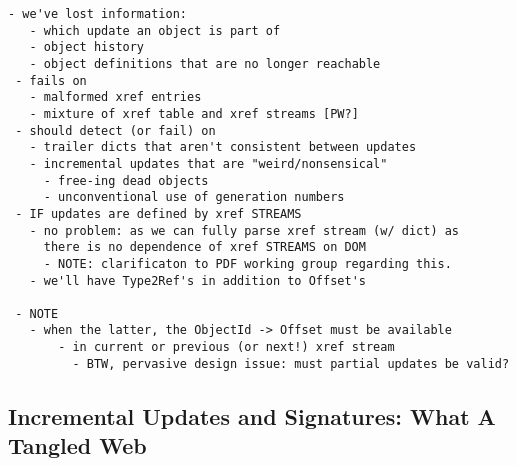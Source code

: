 \begin{lstlisting}[style=meta]
 - we've lost information:
   - which update an object is part of
   - object history
   - object definitions that are no longer reachable
 - fails on
   - malformed xref entries
   - mixture of xref table and xref streams [PW?]
 - should detect (or fail) on
   - trailer dicts that aren't consistent between updates
   - incremental updates that are "weird/nonsensical"
     - free-ing dead objects
     - unconventional use of generation numbers
 - IF updates are defined by xref STREAMS
   - no problem: as we can fully parse xref stream (w/ dict) as
     there is no dependence of xref STREAMS on DOM
     - NOTE: clarificaton to PDF working group regarding this.
   - we'll have Type2Ref's in addition to Offset's
      
 - NOTE 
   - when the latter, the ObjectId -> Offset must be available
       - in current or previous (or next!) xref stream
         - BTW, pervasive design issue: must partial updates be valid?
\end{lstlisting}

\subsection{Incremental Updates and Signatures: What A Tangled Web}
           



